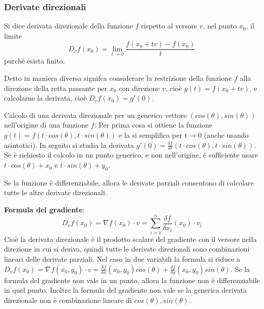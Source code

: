 \subsubsection*{Derivate direzionali}
\begin{tcolorbox}
Si dice derivata direzionale della funzione $f$ rispetto al versore $v$, nel punto $x_0$, il limite
\[
    D_vf(x_0) = \lim_{t\rightarrow 0}\frac{f(x_0 + tv) - f(x_0)}{t}
\]
purchè esista finito.
\end{tcolorbox}
Detto in maniera diversa signifca considerare la restrizione della funzione $f$ alla direzione della retta passante per $x_0$ con direzione $v$, cioè $g(t)= f(x_0+tv)$, e calcolarne la derivata, cioè $D_vf(x_0)= g'(0)$.\newline
\begin{tcolorbox}
Calcolo di una derivata direzionale per un generico vettore $(cos(\theta), sin(\theta))$ nell'origine di una funzione $f$: Per prima cosa si ottiene la funzione $g(t) = f(t \cdot cos(\theta), t \cdot sin(\theta))$ e la si semplifica per $t \rightarrow 0$ (anche usando asintotici). In seguito si studia la derivata $g'(0) = \frac{\delta f}{\delta t}(t \cdot cos(\theta), t \cdot sin(\theta))$.\newline
Se è richiesto il calcolo in un punto generico, e non nell'origine, è sufficiente usare $t \cdot cos(\theta) + x_0$ e $t \cdot sin(\theta) + y_0$.
\end{tcolorbox}
Se la funzione è differenziabile, allora le derivate parziali consentono di calcolare tutte le altre derivate direzionali.
\begin{tcolorbox}
\textbf{Formula del gradiente}: 
\[
    D_vf(x_0) = \nabla f(x_0) \cdot v =  \sum_{i=1}^{n} \frac{\delta f}{\delta x_i}(x_0) \cdot  v_i
\]
Cioè la derivata direzionale è il prodotto scalare del gradiente con il versore nella direzione in cui si deriva, quindi tutte le derivate direzionali sono combinazioni lineari delle derivate parziali. Nel caso in due variabili la formula si riduce a $D_vf(x_0) = \nabla f(x_0,y_0) \cdot v = \frac{\delta f}{\delta x} (x_0,y_0)cos(\theta) + \frac{\delta f}{\delta y}(x_0, y_0) sin(\theta)$.\newline
Se la formula del gradiente non vale in un punto, allora la funzione non è differenziabile in quel punto.\newline
Inoltre la formula del gradiente non vale se la generica derivata direzionale non è combinazione lineare di $cos(\theta), sin(\theta)$.
\end{tcolorbox}

